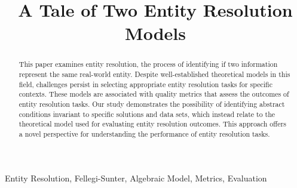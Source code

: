 \documentclass[journal]{IEEEtran}
\begin{document}
    \title{A Tale of Two Entity Resolution Models}
    \author{
    }

    \maketitle

    \theoremstyle{definition}
    \newtheorem{defn}{Definition}[section]
    
    \maketitle
    \begin{abstract}
        This paper examines entity resolution, the process of identifying if two
        information represent the same real-world entity.
        Despite well-established theoretical models in this field, challenges
        persist in selecting appropriate entity resolution tasks for specific
        contexts.
        These models are associated with quality metrics that assess the
        outcomes of entity resolution tasks.
        Our study demonstrates the possibility of identifying abstract
        conditions invariant to specific solutions and data sets, which instead
        relate to the theoretical model used for evaluating entity resolution
        outcomes.
        This approach offers a novel perspective for understanding the
        performance of entity resolution tasks.
    \end{abstract}

    \begin{IEEEkeywords}
        Entity Resolution, Fellegi-Sunter, Algebraic Model, Metrics, Evaluation
    \end{IEEEkeywords}
\end{document}
